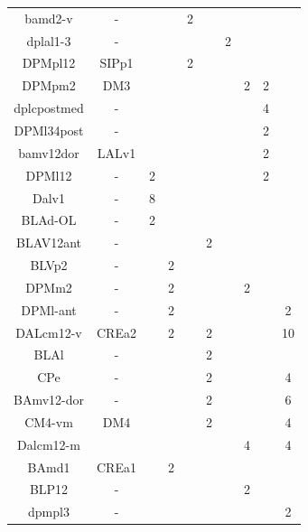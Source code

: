 \documentclass{article}
\begin{document}
\begin{table}
\begin{tabular}{|c|c|cc|cc|cc|cc|}
            bamd2-v & - &   &     &  2 &     &    &     &    &     \\
           dplal1-3 & - &   &     &    &     &  2 &     &    &     \\
            DPMpl12 & SIPp1 &   &     &  2 &     &    &     &    &     \\
             DPMpm2 & DM3 &   &     &    &     &    &   2 &  2 &     \\
        dplcpostmed & - &   &     &    &     &    &     &  4 &     \\
         DPMl34post & - &   &     &    &     &    &     &  2 &     \\
          bamv12dor & LALv1 &   &     &    &     &    &     &  2 &     \\
             DPMl12 & - &  2 &     &    &     &    &     &  2 &     \\
              Dalv1 & - &  8 &     &    &     &    &     &    &     \\
            BLAd-OL & - &  2 &     &    &     &    &     &    &     \\
          BLAV12ant & - &    &     &    &   2 &    &     &    &     \\
              BLVp2 & - &   &   2 &    &     &    &     &    &     \\
              DPMm2 & - &   &   2 &    &     &    &   2 &    &     \\
            DPMl-ant & - &    &   2 &    &     &    &     &    &   2 \\
          DALcm12-v & CREa2  &    &   2 &    &   2 &    &     &    &  10 \\
               BLAl & - &    &     &    &   2 &    &     &    &     \\
                CPe & -  &    &     &    &   2 &    &     &    &   4 \\
         BAmv12-dor & - &    &     &    &   2 &    &     &    &   6 \\
           CM4-vm & DM4 &    &     &    &   2 &    &     &    &   4 \\
        Dalcm12-m & &    &     &    &     &    &   4 &    &   4 \\
            BAmd1 & CREa1&    &   2 &    &     &    &     &    &     \\
            BLP12 & -  &    &     &    &     &    &   2 &    &     \\
           dpmpl3 & - &    &     &    &     &    &     &    &   2 \\

\end{tabular}
\end{table}
\end{document}
